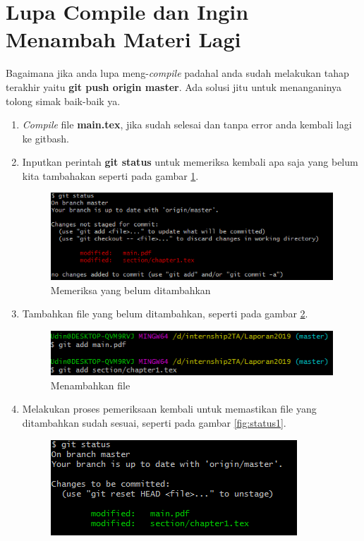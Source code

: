 \section{Lupa Compile dan Ingin Menambah Materi Lagi}
Bagaimana jika anda lupa meng-\textit{compile} padahal anda sudah melakukan tahap terakhir yaitu \textbf{git push origin master}. Ada solusi jitu untuk menanganinya tolong simak baik-baik ya.
\begin{enumerate}
  \item \textit{Compile} file \textbf{main.tex}, jika sudah selesai dan tanpa error anda kembali lagi ke gitbash.
  \item Inputkan perintah \textbf{git status} untuk memeriksa kembali apa saja yang belum kita tambahakan seperti pada gambar \ref{fig:status}.
      \begin{figure}[!htbp]
      \centerline{\includegraphics[width=.75\textwidth]{Figures/manajemenkonflik/status.png}}
      \caption{Memeriksa yang belum ditambahkan}
      \label{fig:status}
      \end{figure}
  \item Tambahkan file yang belum ditambahkan, seperti pada gambar \ref{fig:add}.
      \begin{figure}[!htbp]
      \centerline{\includegraphics[width=.75\textwidth]{Figures/manajemenkonflik/add.png}}
      \caption{Menambahkan file}
      \label{fig:add}
      \end{figure}
  \item Melakukan proses pemeriksaan kembali untuk memastikan file yang ditambahkan sudah sesuai, seperti pada gambar \ref{fig:status1}.
      \begin{figure}[!htbp]
      \centerline{\includegraphics[width=.75\textwidth]{Figures/manajemenkonflik/status1.png}}

\end{figure}
\end{enumerate}
